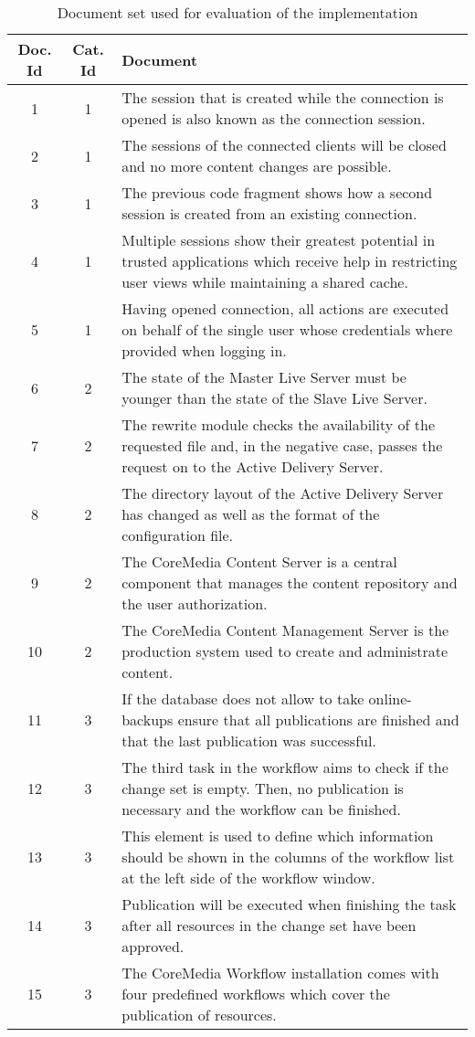 \begin{table} [H]
\centering
\begin{tabular} { c c p{10cm} }
\hline
Doc. Id & Cat. Id & Document \\
\hline
1 & 1 & The session that is created while the connection is opened is also known as the connection session. \\
2 & 1 & The sessions of the connected clients will be closed and no more content changes are possible. \\
3 & 1 & The previous code fragment shows how a second session is created from an existing connection. \\
4 & 1 & Multiple sessions show their greatest potential in trusted applications which receive help in restricting user views while maintaining a shared cache.  \\
5 & 1 & Having opened connection, all actions are executed on behalf of the single user whose credentials where provided when logging in. \\
\hline
6 & 2 & The state of the Master Live Server must be younger than the state of the Slave Live Server.  \\
7 & 2 & The rewrite module checks the availability of the requested file and, in the negative case, passes the request on to the Active Delivery Server. \\
8 & 2 & The directory layout of the Active Delivery Server has changed as well as the format of the configuration file. \\
9 & 2 & The CoreMedia Content Server is a central component that manages the content repository and the user authorization. \\
10 & 2 & The CoreMedia Content Management Server is the production system used to create and administrate content. \\
\hline
11 & 3 & If the database does not allow to take online-backups ensure that all publications are finished and that the last publication was successful. \\
12 & 3 & The third task in the workflow aims to check if the change set is empty. Then, no publication is necessary and the workflow can be finished.  \\
13 & 3 & This element is used to define which information should be shown in the columns of the workflow list at the left side of the workflow window. \\
14 & 3 & Publication will be executed when finishing the task after all resources in the change set have been approved. \\
15 & 3 & The CoreMedia Workflow installation comes with four predefined workflows which cover the publication of resources. \\
\hline
\end{tabular}
\caption[Document set used for evaluation]{Document set used for evaluation of the implementation}
\label{eval:data_set}
\end{table}

